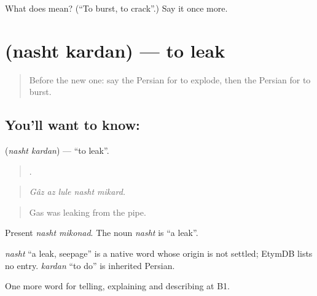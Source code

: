 \begin{tcolorbox}[breakable,colback=teal!4,colframe=teal!35!black,title={Before you move on}]
What does  mean? (\textquotedblleft{}To burst, to crack\textquotedblright{}.) Say it once more.
\end{tcolorbox}
\section[\texorpdfstring{\fa{نشت} \fa{کردن} (nasht kardan)}{نشت کردن (nasht kardan)}]{  (nasht kardan) — to leak}

\label{lesson:FA-C329-nasht-kardan}



\begin{quote}
Before the new one: say the Persian for to explode, then the Persian for to burst.
\end{quote}

\subsection*{You'll want to know:  }
\textbf{ } (\emph{nasht kardan}) — \textquotedblleft{}to leak\textquotedblright{}.

\begin{quote}
    .
\end{quote}

\begin{quote}
\emph{Gâz az lule nasht mikard.}
\end{quote}

\begin{quote}
Gas was leaking from the pipe.
\end{quote}

Present \emph{nasht mikonad}. The noun \emph{nasht} is \textquotedblleft{}a leak\textquotedblright{}.

\begin{cousinweb}
\emph{nasht} \textquotedblleft{}a leak, seepage\textquotedblright{} is a native word whose origin is not settled; EtymDB lists no entry. \emph{kardan} \textquotedblleft{}to do\textquotedblright{} is inherited Persian.
\end{cousinweb}

\begin{grammarlens}[title={What you've built}]
One more word for telling, explaining and describing at B1.
\end{grammarlens}

